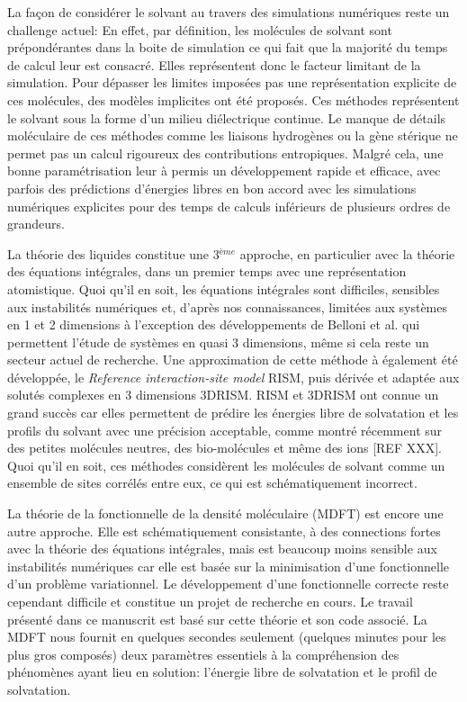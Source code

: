 La façon de considérer le solvant au travers des simulations numériques reste un challenge actuel: En effet, par définition, les molécules de solvant sont prépondérantes dans la boite de simulation ce qui fait que la majorité du temps de calcul leur est consacré. Elles représentent donc le facteur limitant de la simulation. Pour dépasser les limites imposées pas une représentation explicite de ces molécules, des modèles implicites ont été proposés. Ces méthodes représentent le solvant sous la forme d'un milieu diélectrique continue. Le manque de détails moléculaire de ces méthodes comme les liaisons hydrogènes ou la gène stérique ne permet pas un calcul rigoureux des contributions entropiques. Malgré cela, une bonne paramétrisation leur à permis un développement rapide et efficace, avec parfois des prédictions d'énergies libres en bon accord avec les simulations numériques explicites pour des temps de calculs inférieurs de plusieurs ordres de grandeurs. 

La théorie des liquides constitue une 3$^{ème}$ approche, en particulier avec la théorie des équations intégrales, dans un premier temps avec une représentation atomistique. Quoi qu'il en soit, les équations intégrales sont difficiles, sensibles aux instabilités numériques et, d'après nos connaissances, limitées aux systèmes en 1 et 2 dimensions à l'exception des développements de Belloni et al. qui permettent l'étude de systèmes en quasi 3 dimensions, même si cela reste un secteur actuel de recherche. Une approximation de cette méthode à également été développée, le \textit{Reference interaction-site model} RISM, puis dérivée et adaptée aux solutés complexes en 3 dimensions 3DRISM. RISM et 3DRISM ont connue un grand succès car elles permettent de prédire les énergies libre de solvatation et les profils du solvant avec une précision acceptable, comme montré récemment sur des petites molécules neutres, des bio-molécules et même des ions [REF XXX]. Quoi qu'il en soit, ces méthodes considèrent les molécules de solvant comme un ensemble de sites corrélés entre eux, ce qui est schématiquement incorrect.

La théorie de la fonctionnelle de la densité moléculaire (MDFT) est encore une autre approche. Elle est schématiquement consistante, à des connections fortes avec la théorie des équations intégrales, mais est beaucoup moins sensible aux instabilités numériques car elle est basée sur la minimisation d'une fonctionnelle d'un problème variationnel. Le développement d'une fonctionnelle correcte reste cependant difficile et constitue un projet de recherche en cours. Le travail présenté dans ce manuscrit est basé sur cette théorie et son code associé. La MDFT nous fournit en quelques secondes seulement (quelques minutes pour les plus gros composés) deux paramètres essentiels à la compréhension des phénomènes ayant lieu en solution: l'énergie libre de solvatation et le profil de solvatation.



